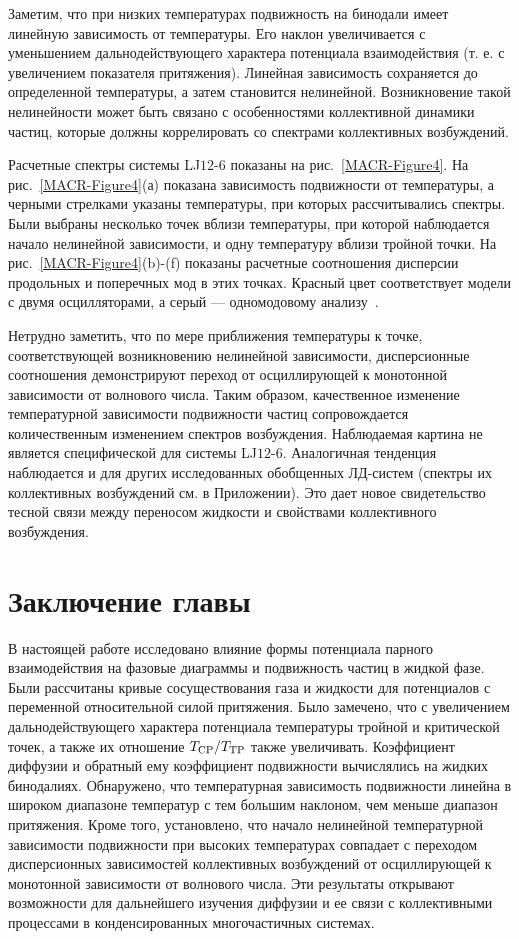 Заметим, что при низких температурах подвижность на бинодали имеет линейную зависимость от температуры. Его наклон увеличивается с уменьшением дальнодействующего характера потенциала взаимодействия (т. е. с увеличением показателя притяжения). Линейная зависимость сохраняется до определенной температуры, а затем становится нелинейной. Возникновение такой нелинейности может быть связано с особенностями коллективной динамики частиц, которые должны коррелировать со спектрами коллективных возбуждений.

Расчетные спектры системы LJ$12$-$6$ показаны на рис.~\ref{MACR-Figure4}. На рис.~\ref{MACR-Figure4}(а) показана зависимость подвижности от температуры, а черными стрелками указаны температуры, при которых рассчитывались спектры. Были выбраны несколько точек вблизи температуры, при которой наблюдается начало нелинейной зависимости, и одну температуру вблизи тройной точки. На рис.~\ref{MACR-Figure4}(b)-(f) показаны расчетные соотношения дисперсии продольных и поперечных мод в этих точках. Красный цвет соответствует модели с двумя осцилляторами, а серый — одномодовому анализу~\cite{10.1038/s41598-019-46979-y}.

Нетрудно заметить, что по мере приближения температуры к точке, соответствующей возникновению нелинейной зависимости, дисперсионные соотношения демонстрируют переход от осциллирующей к монотонной зависимости от волнового числа. Таким образом, качественное изменение температурной зависимости подвижности частиц сопровождается количественным изменением спектров возбуждения. Наблюдаемая картина не является специфической для системы LJ$12$-$6$. Аналогичная тенденция наблюдается и для других исследованных обобщенных ЛД-систем (спектры их коллективных возбуждений см. в Приложении). Это дает новое свидетельство тесной связи между переносом жидкости и свойствами коллективного возбуждения.

\section{Заключение главы}
\label{MACR-SecConclusions}

В настоящей работе исследовано влияние формы потенциала парного взаимодействия на фазовые диаграммы и подвижность частиц в жидкой фазе. Были рассчитаны кривые сосуществования газа и жидкости для потенциалов с переменной относительной силой притяжения. Было замечено, что с увеличением дальнодействующего характера потенциала температуры тройной и критической точек, а также их отношение $T_{\rm CP}/T_{\rm TP}$ также увеличивать. Коэффициент диффузии и обратный ему коэффициент подвижности вычислялись на жидких бинодалиях. Обнаружено, что температурная зависимость подвижности линейна в широком диапазоне температур с тем большим наклоном, чем меньше диапазон притяжения. Кроме того, установлено, что начало нелинейной температурной зависимости подвижности при высоких температурах совпадает с переходом дисперсионных зависимостей коллективных возбуждений от осциллирующей к монотонной зависимости от волнового числа. Эти результаты открывают возможности для дальнейшего изучения диффузии и ее связи с коллективными процессами в конденсированных многочастичных системах.


